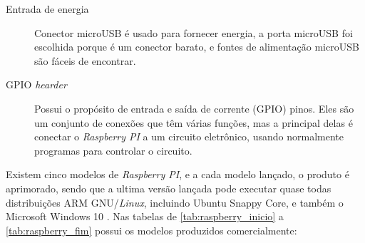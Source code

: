 \documentclass[
	12pt,				%
	openright,			%
	twoside,			%
	a4paper,			%
	chapter=TITLE,		%
	english,			%
	brazil				%
	]{abntex2}
\begin{document}
\begin{description}
\item[Entrada de energia] 
 Conector microUSB é usado para fornecer energia, a porta microUSB foi escolhida porque é um conector barato, e fontes de alimentação microUSB são fáceis de encontrar.

\item[GPIO \textit{hearder}]
Possui o propósito de entrada e saída de corrente (GPIO) pinos. Eles são um conjunto de conexões que têm várias funções, mas a principal delas é conectar o \textit{Raspberry PI} a um circuito eletrônico, usando normalmente programas para controlar o circuito.


\end{description}

Existem cinco modelos de \textit{Raspberry PI}, e a cada modelo lançado, o produto é aprimorado, sendo que a ultima versão lançada pode executar quase todas distribuições ARM GNU/\textit{Linux}, incluindo Ubuntu Snappy Core, e também o Microsoft Windows 10 \cite{raspberrypi.org}. Nas tabelas de \ref{tab:raspberry_inicio} a \ref{tab:raspberry_fim} possui os modelos produzidos comercialmente:
\end{document}
